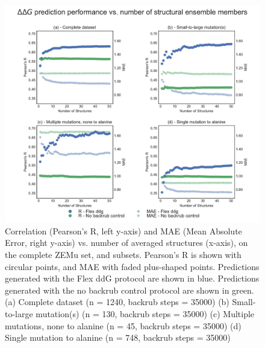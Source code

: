 \begin{figure}
  \includegraphics[width=\textwidth,keepaspectratio]{structs-v-corr-id-zemu-12-60000-rscript-validated-t14.pdf}
  \caption[]{ %
    Correlation (Pearson's R, left y-axis) and MAE (Mean Absolute Error, right y-axis) vs. number of averaged structures (x-axis), on the complete ZEMu set, and subsets.
    Pearson's R is shown with circular points, and MAE with faded plus-shaped points.
    Predictions generated with the Flex ddG protocol are shown in blue.
    Predictions generated with the no backrub control protocol are shown in green.
    (a) Complete dataset (n = 1240, backrub steps = 35000)
    (b) Small-to-large mutation(s) (n = 130, backrub steps = 35000)
    (c) Multiple mutations, none to alanine (n = 45, backrub steps = 35000)
    (d) Single mutation to alanine (n = 748, backrub steps = 35000)
  } \label{fig:structs-v-corr-id-zemu-12-60000-rscript-validated-t14}
\end{figure}
